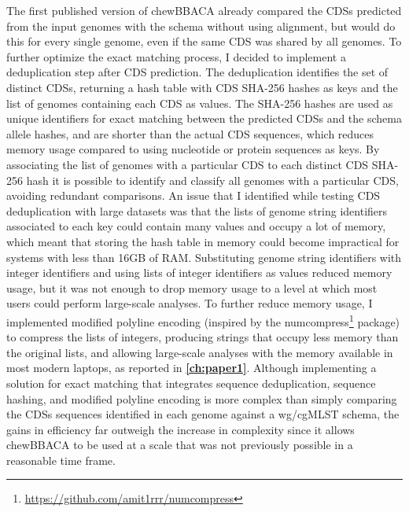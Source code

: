 The first published version of chewBBACA \cite{silva_chewbbaca_2018} already compared the \ac{CDSs} predicted from the input genomes with the schema without using alignment, but would do this for every single genome, even if the same \ac{CDS} was shared by all genomes. To further optimize the exact matching process, I decided to implement a deduplication step after \ac{CDS} prediction. The deduplication identifies the set of distinct \ac{CDSs}, returning a hash table with \ac{CDS} SHA-256 hashes as keys and the list of genomes containing each \ac{CDS} as values. The SHA-256 hashes are used as unique identifiers for exact matching between the predicted \ac{CDSs} and the schema allele hashes, and are shorter than the actual \ac{CDS} sequences, which reduces memory usage compared to using nucleotide or protein sequences as keys. By associating the list of genomes with a particular \ac{CDS} to each distinct \ac{CDS} SHA-256 hash it is possible to identify and classify all genomes with a particular \ac{CDS}, avoiding redundant comparisons. An issue that I identified while testing \ac{CDS} deduplication with large datasets was that the lists of genome string identifiers associated to each key could contain many values and occupy a lot of memory, which meant that storing the hash table in memory could become impractical for systems with less than 16GB of \ac{RAM}. Substituting genome string identifiers with integer identifiers and using lists of integer identifiers as values reduced memory usage, but it was not enough to drop memory usage to a level at which most users could perform large-scale analyses. To further reduce memory usage, I implemented modified polyline encoding (inspired by the numcompress\footnote{\url{https://github.com/amit1rrr/numcompress}} package) to compress the lists of integers, producing strings that occupy less memory than the original lists, and allowing large-scale analyses with the memory available in most modern laptops, as reported in \textbf{\autoref{ch:paper1}}. Although implementing a solution for exact matching that integrates sequence deduplication, sequence hashing, and modified polyline encoding is more complex than simply comparing the \ac{CDSs} sequences identified in each genome against a \ac{wg/cgMLST} schema, the gains in efficiency far outweigh the increase in complexity since it allows chewBBACA to be used at a scale that was not previously possible in a reasonable time frame.

